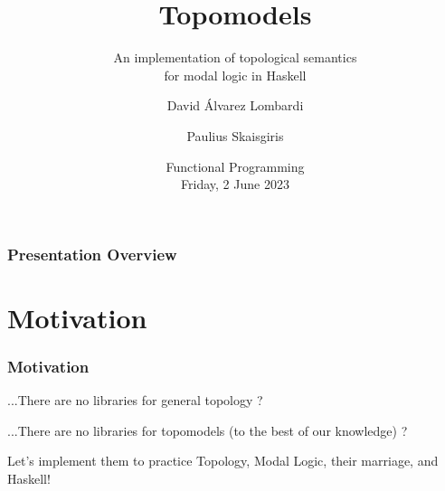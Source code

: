 \documentclass[
	11pt, %
	aspectratio=1610, %
]{beamer}
\title[Topomodels]{Topomodels} %
\subtitle{An implementation of topological semantics \\ for modal logic in Haskell} %
\author[David Álvarez Lombardi \& Paulius Skaisgiris]{David Álvarez Lombardi \and Paulius Skaisgiris} %
\institute[ILLC]{Institute for Logic, Language, and Computation \\ \smallskip University of Amsterdam} %
\date[Friday, 2 June 2023]{Functional Programming\\ \smallskip Friday, 2 June 2023} %
\begin{document}

\begin{frame}
	\titlepage %
\end{frame}



\begin{frame}
	\frametitle{Presentation Overview} %

	\tableofcontents %
\end{frame}


\section{Motivation}


\begin{frame}
	\frametitle{Motivation}

	...There are no libraries for general topology ?

	\bigskip\bigskip

	...There are no libraries for topomodels (to the best of our knowledge) ?

	\bigskip\bigskip

	Let's implement them to practice Topology, Modal Logic, their marriage, and Haskell!

\end{frame}
\end{document}
